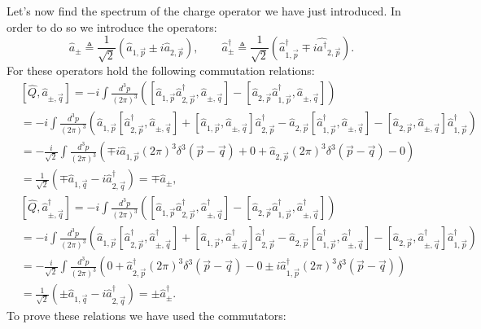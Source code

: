 Let's now find the spectrum of the charge operator we have just introduced. In order to do so we introduce the operators:
\begin{equation*}
    \hat{a}_{\pm}\triangleq\frac{1}{\sqrt{2}}(\hat{a}_{1,\vec p}\pm i\hat{a}_{2,\vec p}),\qquad\hat{a}^\dagger_{\pm}\triangleq\frac{1}{\sqrt{2}}(\hat{a}^\dagger_{1,\vec p}\mp i\hat{a^\dagger}_{2,\vec p}).
\end{equation*}
For these operators hold the following commutation relations:
\begin{align*}
    &[\hat Q,\hat{a}_{\pm,\vec q}]=-i\int\frac{d^3p}{(2\pi)^3}([\hat{a}_{1,\vec p}\hat{a}_{2,\vec p}^\dagger,\hat{a}_{\pm,\vec q}]-[\hat{a}_{2,\vec p}\hat{a}_{1,\vec p}^\dagger,\hat{a}_{\pm,\vec q}])\\
    &=-i\int\frac{d^3p}{(2\pi)^3}(\hat{a}_{1,\vec p}[\hat{a}_{2,\vec p}^\dagger,\hat{a}_{\pm,\vec q}]+[\hat{a}_{1,\vec p},\hat{a}_{\pm,\vec q}]\hat{a}_{2,\vec p}^\dagger-\hat{a}_{2,\vec p}[\hat{a}_{1,\vec p}^\dagger,\hat{a}_{\pm,\vec q}]-[\hat{a}_{2,\vec p},\hat{a}_{\pm,\vec q}]\hat{a}_{1,\vec p}^\dagger)\\
    &=-\frac{i}{\sqrt{2}}\int\frac{d^3p}{(2\pi)^3}(\mp i\hat{a}_{1,\vec p}(2\pi)^3\delta^3(\vec p-\vec q)+0+\hat{a}_{2,\vec p}(2\pi)^3\delta^3(\vec p-\vec q)-0)\\&=\frac{1}{\sqrt{2}}(\mp\hat{a}_{1,\vec q}-i\hat{a}_{2,\vec q}^\dagger)=\mp\hat{a}_{\pm},
\end{align*}
\begin{align*}
    &[\hat Q,\hat{a}_{\pm,\vec q}^\dagger]=-i\int\frac{d^3p}{(2\pi)^3}([\hat{a}_{1,\vec p}\hat{a}_{2,\vec p}^\dagger,\hat{a}_{\pm,\vec q}^\dagger]-[\hat{a}_{2,\vec p}\hat{a}_{1,\vec p}^\dagger,\hat{a}_{\pm,\vec q}^\dagger])\\
    &=-i\int\frac{d^3p}{(2\pi)^3}(\hat{a}_{1,\vec p}[\hat{a}_{2,\vec p}^\dagger,\hat{a}_{\pm,\vec q}^\dagger]+[\hat{a}_{1,\vec p},\hat{a}_{\pm,\vec q}^\dagger]\hat{a}_{2,\vec p}^\dagger-\hat{a}_{2,\vec p}[\hat{a}_{1,\vec p}^\dagger,\hat{a}_{\pm,\vec q}^\dagger]-[\hat{a}_{2,\vec p},\hat{a}_{\pm,\vec q}^\dagger]\hat{a}_{1,\vec p}^\dagger)\\
    &=-\frac{i}{\sqrt{2}}\int\frac{d^3p}{(2\pi)^3}(0+\hat{a}_{2,\vec p}^\dagger(2\pi)^3\delta^3(\vec p-\vec q)-0\pm i\hat{a}_{1,\vec p}^\dagger(2\pi)^3\delta^3(\vec p-\vec q))\\&=\frac{1}{\sqrt{2}}(\pm\hat{a}_{1,\vec q}-i\hat{a}_{2,\vec q}^\dagger)=\pm\hat{a}_{\pm}^\dagger.
\end{align*}
To prove these relations we have used the commutators:
